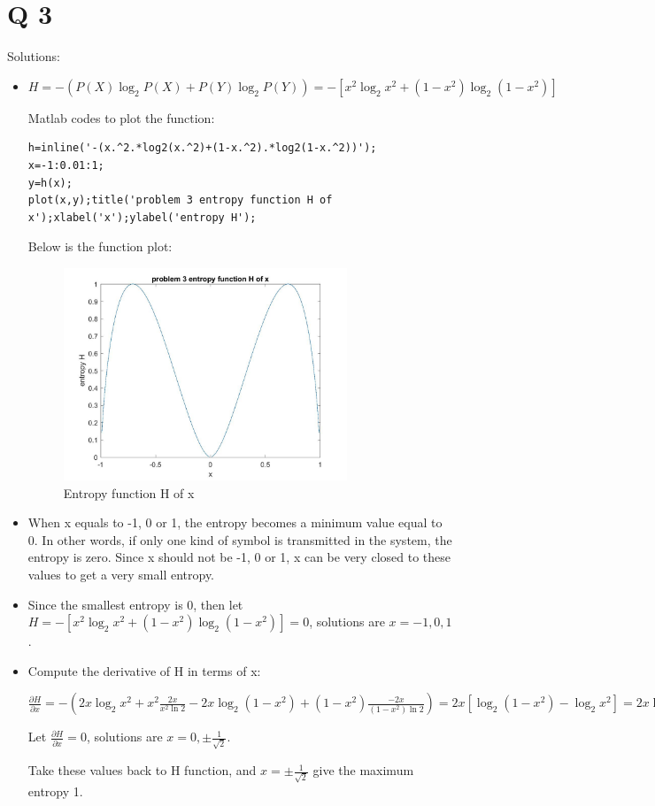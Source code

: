 \documentclass[10pt]{report}            %
\begin{document}
  \section*{Q 3}                  %
  Solutions:
  \begin{itemize}
  	\item
  	\par $H=-(P(X)\log_2 P(X)+P(Y)\log_2 P(Y))=-[x^2\log_2 x^2+(1-x^2)\log_2(1-x^2)]$
  	\par Matlab codes to plot the function:
	\begin{lstlisting}
h=inline('-(x.^2.*log2(x.^2)+(1-x.^2).*log2(1-x.^2))');
x=-1:0.01:1;
y=h(x);
plot(x,y);title('problem 3 entropy function H of x');xlabel('x');ylabel('entropy H');
	\end{lstlisting}
	\par Below is the function plot:
	\newpage
	\begin{figure}[h!]
		\centering
		\includegraphics[width=0.8\textwidth]{q3_1}
		\caption{Entropy function H of x}
	\end{figure}
	\item
	When x equals to -1, 0 or 1, the entropy becomes a minimum value equal to 0. In other words, if only one kind of symbol is transmitted in the system, the entropy is zero. Since x should not be -1, 0 or 1, x can be very closed to these values to get a very small entropy.
	\item
	\par Since the smallest entropy is 0, then let $H=-[x^2\log_2 x^2+(1-x^2)\log_2(1-x^2)]=0$, solutions are $x=-1, 0, 1$.
	\item
	\par Compute the derivative of H in terms of x:
	\par $\frac{\partial H}{\partial x}=-(2x\log_2 x^2+x^2 \frac{2x}{x^2\ln 2}-2x\log_2 (1-x^2)+(1-x^2)\frac{-2x}{(1-x^2)\ln 2})=2x[\log_2(1-x^2)-\log_2 x^2]=2x\log_2(\frac{1}{x^2}-1)$
	\par Let $\frac{\partial H}{\partial x}=0$, solutions are $x=0,\pm \frac{1}{\sqrt{2}}$.
	\par Take these values back to H function, and $x=\pm \frac{1}{\sqrt{2}}$ give the maximum entropy 1.
  \end{itemize}
\iffalse  
\end{document}
